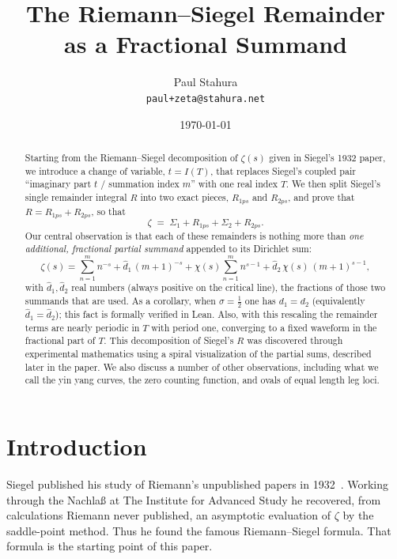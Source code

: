\documentclass[11pt]{article}
\title{\textbf{The Riemann--Siegel Remainder\\ as a Fractional Summand}}
\author{Paul Stahura\\[0.3em]\small\texttt{paul+zeta@stahura.net}}
\date{\today}
\theoremstyle{definition}
\begin{document}
\maketitle

\begin{abstract}
Starting from the Riemann--Siegel decomposition of $\zeta(s)$ given in Siegel's
1932 paper, we introduce a change of variable, $t=I(T)$, that replaces
Siegel's coupled pair ``imaginary part $t$ / summation index $m$'' with one real
index $T$. We then split Siegel's single remainder integral $R$ into two
exact pieces, $R_{1ps}$ and $R_{2ps}$, and prove that
$R = R_{1ps}+R_{2ps}$, so that
\[
\zeta \;=\; \Sigma_{1} + R_{1ps} + \Sigma_{2} + R_{2ps}.
\]
Our central observation is that each of these remainders is nothing more than
\emph{one additional, fractional partial summand} appended to its Dirichlet sum:
\[
\zeta(s)=\sum_{n=1}^{m} n^{-s} + \hat d_1\,(m+1)^{-s}
        + \chi(s)\sum_{n=1}^{m} n^{s-1} + \hat d_2\,\chi(s)\,(m+1)^{s-1},
\]
with $\hat d_1,\hat d_2$ real numbers (always positive on the critical line),
the fractions of those two
summands that are used. As a corollary, when $\sigma=\tfrac12$ one
has $d_1=d_2$ (equivalently $\hat d_1=\hat d_2$); this fact is formally
verified in Lean. Also, with this rescaling the remainder terms are nearly
periodic in $T$ with period one, converging to a fixed waveform in the
fractional part of $T$. This decomposition of Siegel's $R$ was
discovered through experimental mathematics using a spiral visualization of the
partial sums, described later in the paper. We also discuss a number of
other observations, including what we call the yin yang curves, the zero
counting function, and ovals of equal length leg loci.
\end{abstract}

\clearpage
\tableofcontents
\clearpage

\section{Introduction}

Siegel published his study of Riemann's unpublished papers in
1932~\cite{Siegel1932}. Working through the Nachla\ss{} at The Institute for
Advanced Study he
recovered, from calculations Riemann never published, an asymptotic
evaluation of $\zeta$ by the saddle-point method. Thus he found the famous
Riemann--Siegel formula. That formula is the starting point of this
paper.
\end{document}
